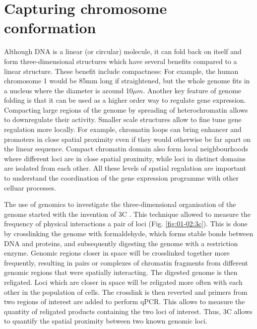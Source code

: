 \section{Capturing chromosome conformation}

Although DNA is a linear (or circular) molecule, it can fold back on itself and form three-dimensional structures which have several benefits compared to a linear structure. These benefit include compactness: For example, the human chromosome 1 would be 85mm long if straightened, but the whole genome fits in a nucleus where the diameter is around 10$\mu m$. Another key feature of genome folding is that it can be used as a higher order way to regulate gene expression. Compacting large regions of the genome by spreading of \Gls{heterochromatin} allows to downregulate their activity. Smaller scale structures allow to fine tune gene regulation more locally. For example, \Gls{chromatin} loops can bring enhancer and promoters in close spatial proximity even if they would otherwise be far apart on the linear sequence. Compact chromatin domain also form local neighbourhoods where different loci are in close spatial proximity, while loci in distinct domains are isolated from each other. All these levels of spatial regulation are important to understand the coordination of the gene expression programme with other celluar processes.

The use of genomics to investigate the three-dimensional organisation of the genome started with the invention of \acrfull{3C} \cite{Dekker2002}. This technique allowed to measure the frequency of physical interactions a pair of loci (Fig. \ref{fig:01-02:3c}). This is done by crosslinking the genome with formaldehyde, which forms stable bonds between DNA and proteins, and subsequently digesting the genome with a restriction enzyme. Genomic regions closer in space will be crosslinked together more frequently, resulting in pairs or complexes of chromatin fragments from different genomic regions that were spatially interacting. The digested genome is then religated. Loci which are closer in space will be religated more often with each other in the population of cells. The crosslink is then reverted and primers from two regions of interest are added to perform qPCR. This allows to measure the quantity of religated products containing the two loci of interest. Thus, 3C allows to quantify the spatial proximity between two known genomic loci. 

